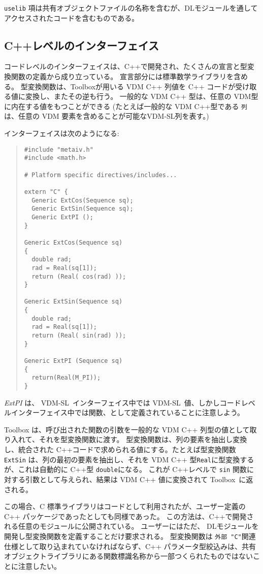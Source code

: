 \documentclass[\pformat,12pt]{jarticle}
\newcommand{\vdmslpp}{VDM-SL}
\newcommand{\Toolbox}{Toolbox}
\begin{document}
 {\tt uselib} 項は共有オブジェクトファイルの名称を含むが、DLモジュールを通してアクセスされたコードを含むものである。


\subsection*{C++レベルのインターフェイス}

コードレベルのインターフェイスは、C++で開発され、たくさんの宣言と型変換関数の定義から成り立っている。 
宣言部分には標準数学ライブラリを含める。
型変換関数は、Toolboxが用いる VDM C++ 列値を C++ コードが受け取る値に変換し、またその逆も行う。 
一般的な VDM C++ 型は、任意の VDM型に内在する値をもつことができる (たとえば一般的な VDM C++型である {\tt 列} は、任意の VDM 要素を含めることが可能なVDM-SL列を表す。)

インターフェイスは次のようになる:

\begin{quote}
\begin{verbatim}
#include "metaiv.h"
#include <math.h>

# Platform specific directives/includes...

extern "C" {
  Generic ExtCos(Sequence sq);
  Generic ExtSin(Sequence sq);
  Generic ExtPI ();
}

Generic ExtCos(Sequence sq)
{
  double rad;
  rad = Real(sq[1]);
  return (Real( cos(rad) ));
}

Generic ExtSin(Sequence sq)
{
  double rad; 
  rad = Real(sq[1]);
  return (Real( sin(rad) ));
}

Generic ExtPI (Sequence sq)
{
  return(Real(M_PI));
}  
\end{verbatim}
\end{quote}

 {\em ExtPI\/} は、 \vdmslpp\ インターフェイス中では \vdmslpp\ 値、しかしコードレベルインターフェイス中では関数、として定義されていることに注意しよう。

Toolbox は、呼び出された関数の引数を一般的な VDM C++ 列型の値として取り入れて、それを型変換関数に渡す。
型変換関数は、列の要素を抽出し変換し、統合された C++コードで求められる値にする。たとえば型変換関数 {\tt ExtSin} は、列の最初の要素を抽出し、それを VDM C++ 型{\tt Real}に型変換するが、これは自動的に C++型 {\tt double}になる。
これが C++レベルで {\tt sin} 関数に対する引数として与えられ、結果は VDM C++ 値に変換されて \Toolbox\ に返される。

この場合、C 標準ライブラリはコードとして利用されたが、ユーザー定義の C++ パッケージであったとしても同様であった。
この方法は、C++で開発される任意のモジュールに公開されている。 
ユーザーにはただ、 DLモジュールを開発し型変換関数を定義することだけ要求される。
型変換関数は {\tt 外部 "C"}関連仕様として取り込まれていなければならず、C++ パラメータ型絞込みは、共有オブジェクトライブラリにある関数標識名称から一部つくられたものではないことに注意したい。
\end{document}

